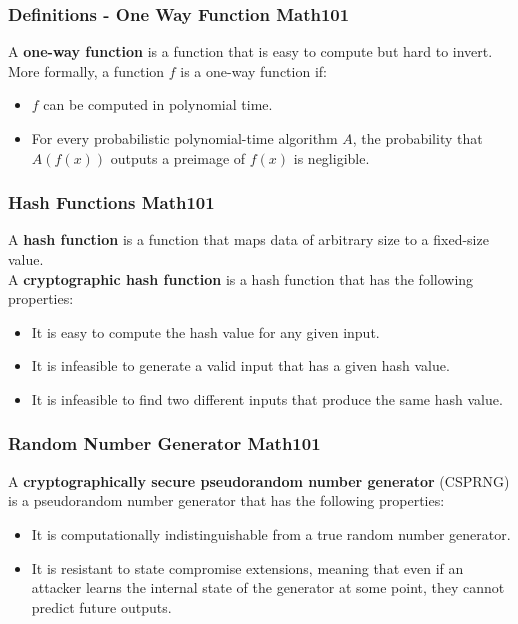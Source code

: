 \documentclass[12pt]{beamer}
\newcommand{\FrameTitle}[2]{\frametitle{#1 \hfill \small\textnormal{\textcolor{midgray}{#2}}}}
\newcommand{\nl}{\vspace*{1em}\\}
\begin{document}
\begin{frame}\FrameTitle{Definitions - One Way Function}{Math101}
    A \textbf{one-way function} is a function that is easy to compute but hard to invert.\nl
    \vspace*{1em}
    More formally, a function $f$ is a one-way function if:
    \begin{itemize}
        \item $f$ can be computed in polynomial time.
        \item For every probabilistic polynomial-time algorithm $A$, the probability that $A(f(x))$
            outputs a preimage of $f(x)$ is negligible.
    \end{itemize}
\end{frame}

\begin{frame}\FrameTitle{Hash Functions}{Math101}
    A \textbf{hash function} is a function that maps data of arbitrary size to a fixed-size value.\nl
    \vspace*{1em}
    A \textbf{cryptographic hash function} is a hash function that has the following properties:
    \begin{itemize}
        \item It is easy to compute the hash value for any given input.
        \item It is infeasible to generate a valid input that has a given hash value.
        \item It is infeasible to find two different inputs that produce the same hash value.
    \end{itemize}
\end{frame}

\begin{frame}\FrameTitle{Random Number Generator}{Math101}
    A \textbf{cryptographically secure pseudorandom number generator} (CSPRNG)
    is a pseudorandom number generator that has the following properties:
    \begin{itemize}
        \item It is computationally indistinguishable from a true random number generator.
        \item It is resistant to state compromise extensions, meaning that even if an attacker
                learns the internal state of the generator at some point, they cannot predict future outputs.
    \end{itemize}
\end{frame}
\end{document}
